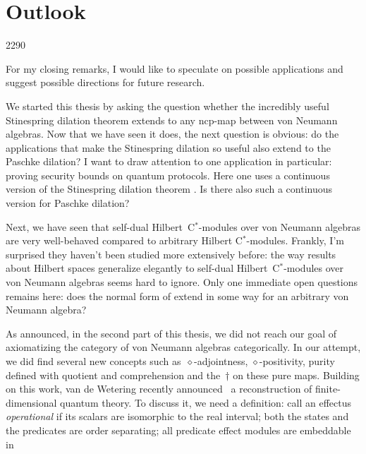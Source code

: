 
\chapter{Outlook}
\begin{parsec}{2290}%
\begin{point}{10}%
For my closing remarks, I would like to speculate
    on possible applications
    and suggest possible
        directions for future research.

We started this thesis by asking the question
    whether the incredibly useful Stinespring dilation theorem
    extends to any ncp-map between von Neumann algebras.
Now that we have seen it does, the next question is obvious:
    do the applications that make the Stinespring dilation so useful
    also extend to the Paschke dilation?
I want to draw attention to one application in particular:
    proving security bounds on quantum protocols.
Here one uses a continuous version
    of the Stinespring dilation theorem \cite{werner2}.
Is there also such a continuous version for Paschke dilation?
\begin{point}{20}%
Next, we have seen that self-dual Hilbert~C$^*$-modules
    over von Neumann algebras
    are very well-behaved compared
    to arbitrary Hilbert C$^*$-modules.
    Frankly, I'm surprised they haven't been studied
        more extensively before:
        the way results about Hilbert spaces
        generalize elegantly to self-dual Hilbert~C$^*$-modules
        over von Neumann algebras seems hard to ignore.
Only one immediate open questions remains here:
    does the normal form of 
    extend in some way for an arbitrary von Neumann algebra?
\end{point}
\begin{point}{30}%
As announced, in the second part of this thesis, we did not reach
    our goal of axiomatizing the category of von Neumann algebras
    categorically.
In our attempt, we did find several new concepts
    such as~$\diamond$-adjointness, $\diamond$-positivity,
        purity defined with quotient and comprehension and
        the~$\dagger$ on these pure maps.
Building on this work,
    van de Wetering recently announced~\cite{wetering}
    a reconstruction of finite-dimensional quantum theory.
    To discuss it, we need a definition: call an effectus \emph{operational}
        if its scalars are isomorphic to the real interval;
        both the states and the predicates are order separating;
        all predicate effect modules are embeddable in

\end{point}
\end{point}
\end{parsec}
